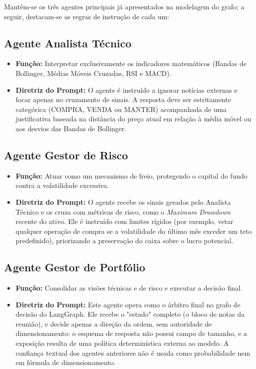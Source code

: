 \documentclass{eic-bcc-tcc}
\begin{document}
Mantêm-se os três agentes principais já apresentados na modelagem do grafo; a seguir, destacam-se as regras de instrução de cada um:

\subsection{Agente Analista Técnico}
\begin{itemize}
    \item \textbf{Função:} Interpretar exclusivamente os indicadores matemáticos (Bandas de Bollinger, Médias Móveis Cruzadas, RSI e MACD).
    \item \textbf{Diretriz do Prompt:} O agente é instruído a ignorar notícias externas e focar apenas no cruzamento de sinais. A resposta deve ser estritamente categórica (COMPRA, VENDA ou MANTER) acompanhada de uma justificativa baseada na distância do preço atual em relação à média móvel ou aos desvios das Bandas de Bollinger.
\end{itemize}

\subsection{Agente Gestor de Risco}
\begin{itemize}
    \item \textbf{Função:} Atuar como um mecanismo de freio, protegendo o capital do fundo contra a volatilidade excessiva.
    \item \textbf{Diretriz do Prompt:} O agente recebe os sinais gerados pelo Analista Técnico e os cruza com métricas de risco, como o \textit{Maximum Drawdown} recente do ativo. Ele é instruído com limites rígidos (por exemplo, vetar qualquer operação de compra se a volatilidade do último mês exceder um teto predefinido), priorizando a preservação do caixa sobre o lucro potencial.
\end{itemize}

\subsection{Agente Gestor de Portfólio}
\begin{itemize}
    \item \textbf{Função:} Consolidar as visões técnicas e de risco e executar a decisão final.
    \item \textbf{Diretriz do Prompt:} Este agente opera como o árbitro final no grafo de decisão do LangGraph. Ele recebe o "estado" completo (o bloco de notas da reunião), e decide apenas a direção da ordem, sem autoridade de dimensionamento: o esquema de resposta não possui campo de tamanho, e a exposição resulta de uma política determinística externa ao modelo. A confiança textual dos agentes anteriores não é usada como probabilidade nem em fórmula de dimensionamento.
\end{itemize}
\end{document}

